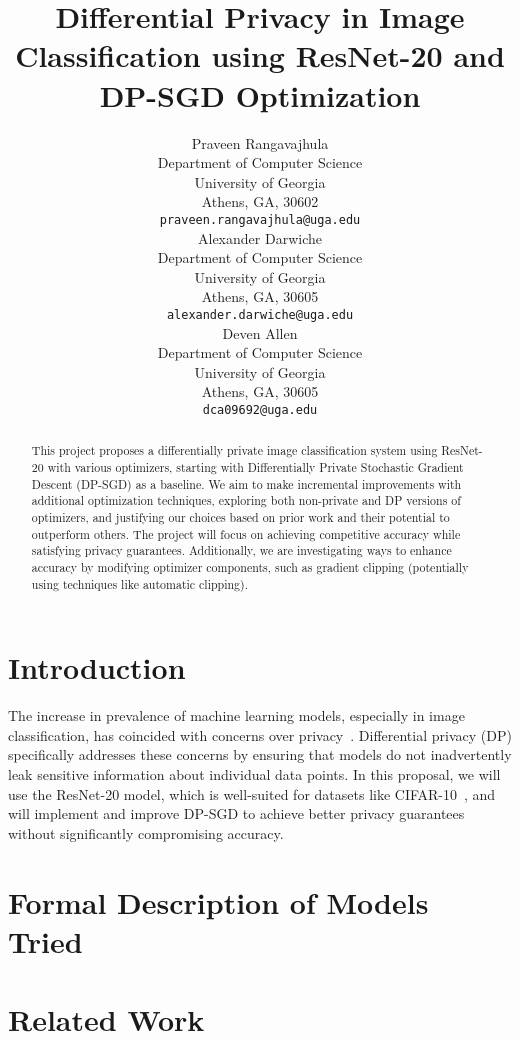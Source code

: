 \documentclass{article}
\title{Differential Privacy in Image Classification using ResNet-20 and DP-SGD Optimization}
\author{
    Praveen Rangavajhula\\
    Department of Computer Science\\
    University of Georgia\\
    Athens, GA, 30602\\
    \texttt{praveen.rangavajhula@uga.edu} \\
    \And
    Alexander Darwiche\\
    Department of Computer Science\\
    University of Georgia\\
    Athens, GA, 30605 \\
    \texttt{alexander.darwiche@uga.edu} \\
    \And
    Deven Allen\\
    Department of Computer Science\\
    University of Georgia\\
    Athens, GA, 30605 \\
    \texttt{dca09692@uga.edu} \\
}
\begin{document}
    \maketitle

    \begin{abstract}

        This project proposes a differentially private image classification system using ResNet-20 with various
        optimizers, starting with Differentially Private Stochastic Gradient Descent (DP-SGD) as a baseline.
        We aim to make incremental improvements with additional optimization techniques, exploring both non-private
        and DP versions of optimizers, and justifying our choices based on prior work and their potential
        to outperform others.
        The project will focus on achieving competitive accuracy while satisfying privacy guarantees.
        Additionally, we are investigating ways to enhance accuracy by modifying optimizer components,
        such as gradient clipping (potentially using techniques like automatic clipping).

    \end{abstract}


    \section{Introduction}\label{sec:introduction}

    The increase in prevalence of machine learning models, especially in image classification,
    has coincided with concerns over privacy~\cite{papernot2022hyperparametertuningrenyidifferential}.
    Differential privacy (DP) specifically addresses these concerns by ensuring that models do not inadvertently leak sensitive
    information about individual data points.
    In this proposal, we will use the ResNet-20 model, which is well-suited for datasets like CIFAR-10~\cite{Idelbayev_ResNet20},
    and will implement and improve DP-SGD to achieve better privacy guarantees without significantly compromising accuracy.

    \section{Formal Description of Models Tried}\label{sec:models}
    

    \section{Related Work}\label{sec:related-work}
\end{document}
